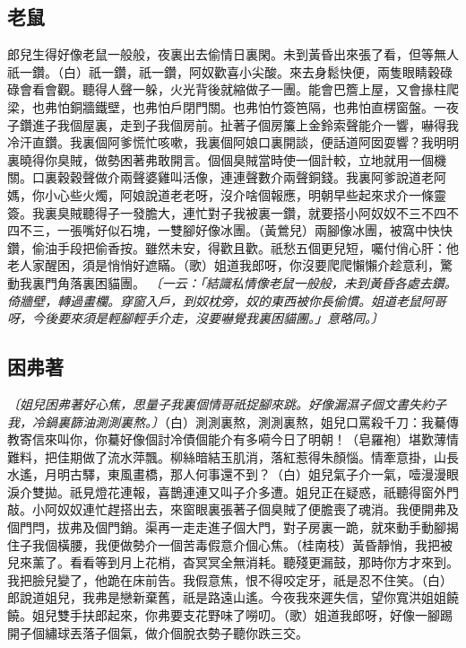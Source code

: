 \subsection*{老鼠}

郎兒生得好像老鼠一般般，夜裏出去偷情日裏閑。未到黃昏出來張了看，但等無人祇一鑽。（白）祇一鑽，祇一鑽，阿奴歡喜小尖酸。來去身鬆快便，兩隻眼睛穀碌碌會看會觀。聽得人聲一躲，火光背後就縮做子一團。能會巴簷上屋，又會掾柱爬梁，也弗怕銅牆鐵壁，也弗怕戶閉門關。也弗怕竹簽笆隔，也弗怕直楞窗盤。一夜子鑽進子我個屋裏，走到子我個房前。扯著子個房簾上金鈴索聲能介一響，嚇得我冷汗直鑽。我裏個阿爹慌忙咳嗽，我裏個阿娘口裏開談，便話道阿囡耍響？我明明裏曉得你臭賊，做勢困著弗敢開言。個個臭賊當時使一個計較，立地就用一個機關。口裏穀穀聲做介兩聲婆雞叫活像，連連聲數介兩聲銅錢。我裏阿爹說道老阿媽，你小心些火燭，阿娘說道老老呀，沒介啥個報應，明朝早些起來求介一條靈簽。我裏臭賊聽得子一發膽大，連忙對子我被裏一鑽，就要搭小阿奴奴不三不四不四不三，一張嘴好似石塊，一雙腳好像冰團。（黃鶯兒）兩腳像冰團，被窩中快快鑽，偷油手段把偷香按。雖然未安，得歡且歡。祇愁五個更兒短，囑付俏心肝：他老人家醒困，須是悄悄好遮瞞。（歌）姐道我郎呀，你沒要爬爬懶懶介趁意利，驚動我裏門角落裏困貓團。
\textit{〔一云：「結識私情像老鼠一般般，未到黃昏各處去鑽。倚牆壁，轉過畫欄。穿窗入戶，到奴枕旁，奴的東西被你長偷慣。姐道老鼠阿哥呀，今後要來須是輕腳輕手介走，沒要嚇覺我裏困貓團。」意略同。〕}

\subsection*{困弗著}

\textit{〔姐兒困弗著好心焦，思量子我裏個情哥祇捉腳來跳。好像漏濕子個文書失約子我，冷鍋裏篩油測測裏熬。〕}（白）測測裏熬，測測裏熬，姐兒口罵殺千刀：我驀傳教寄信來叫你，你驀好像個討冷債個能介有多嗬今日了明朝！（皂羅袍）堪歎薄情難料，把佳期做了流水萍飄。柳絲暗結玉肌消，落紅惹得朱顏惱。情牽意掛，山長水遙，月明古驛，東風畫橋，那人何事還不到？（白）姐兒氣子介一氣，噎漫漫眼淚介雙拋。祇見燈花連報，喜鵲連連又叫子介多遭。姐兒正在疑惑，祇聽得窗外門敲。小阿奴奴連忙趕搭出去，來窗眼裏張著子個臭賊了便膽喪了魂消。我便開弗及個門閂，拔弗及個門銷。渠再一走走進子個大門，對子房裏一跪，就來動手動腳揭住子我個橫腰，我便做勢介一個苦毒假意介個心焦。（桂南枝）黃昏靜悄，我把被兒來薰了。看看等到月上花梢，杳冥冥全無消耗。聽殘更漏鼓，那時你方才來到。我把臉兒變了，他跪在床前告。我假意焦，恨不得咬定牙，祇是忍不住笑。（白）郎說道姐兒，我弗是戀新棄舊，祇是路遠山遙。今夜我來遲失信，望你寬洪姐姐饒饒。姐兒雙手扶郎起來，你弗要支花野味了嘮叨。（歌）姐道我郎呀，好像一腳踢開子個繡球丟落子個氣，做介個脫衣勢子聽你跌三交。

